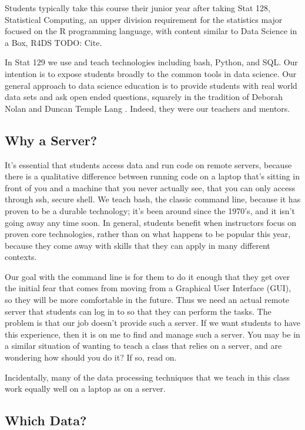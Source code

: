 \documentclass[12pt]{article}
\begin{document}
Students typically take this course their junior year after taking Stat 128, Statistical Computing, an upper division requirement for the statistics major focused on the R programming language, with content similar to Data Science in a Box, R4DS TODO: Cite.

In Stat 129 we use and teach technologies including bash, Python, and SQL.
Our intention is to expose students broadly to the common tools in data science.
Our general approach to data science education is to provide students with real world data sets and ask open ended questions, squarely in the tradition of Deborah Nolan and Duncan Temple Lang \cite{nolan2010computing}.
Indeed, they were our teachers and mentors.



\subsection{Why a Server?}

It's essential that students access data and run code on remote servers, because there is a qualitative difference between running code on a laptop that's sitting in front of you and a machine that you never actually see, that you can only access through ssh, secure shell.
We teach bash, the classic command line, because it has proven to be a durable technology; it's been around since the 1970's, and it isn't going away any time soon.
In general, students benefit when instructors focus on proven core technologies, rather than on what happens to be popular this year, because they come away with skills that they can apply in many different contexts.

Our goal with the command line is for them to do it enough that they get over the initial fear that comes from moving from a Graphical User Interface (GUI), so they will be more comfortable in the future.
Thus we need an actual remote server that students can log in to so that they can perform the tasks.
The problem is that our job doesn't provide such a server.
If we want students to have this experience, then it is on me to find and manage such a server.
You may be in a similar situation of wanting to teach a class that relies on a server, and are wondering how should you do it?
If so, read on.

Incidentally, many of the data processing techniques that we teach in this class work equally well on a laptop as on a server.

\subsection{Which Data?}
\end{document}
